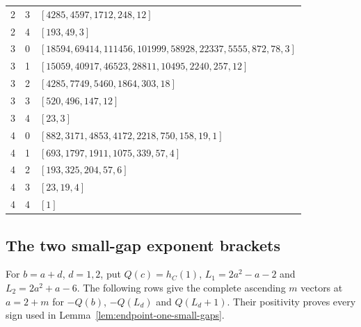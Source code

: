 \begin{tabular}{ccp{13.6cm}}
2 & 3 & $[4285,\allowbreak 4597,\allowbreak 1712,\allowbreak 248,\allowbreak 12]$\\
2 & 4 & $[193,\allowbreak 49,\allowbreak 3]$\\
3 & 0 & $[18594,\allowbreak 69414,\allowbreak 111456,\allowbreak 101999,\allowbreak 58928,\allowbreak 22337,\allowbreak 5555,\allowbreak 872,\allowbreak 78,\allowbreak 3]$\\
3 & 1 & $[15059,\allowbreak 40917,\allowbreak 46523,\allowbreak 28811,\allowbreak 10495,\allowbreak 2240,\allowbreak 257,\allowbreak 12]$\\
3 & 2 & $[4285,\allowbreak 7749,\allowbreak 5460,\allowbreak 1864,\allowbreak 303,\allowbreak 18]$\\
3 & 3 & $[520,\allowbreak 496,\allowbreak 147,\allowbreak 12]$\\
3 & 4 & $[23,\allowbreak 3]$\\
4 & 0 & $[882,\allowbreak 3171,\allowbreak 4853,\allowbreak 4172,\allowbreak 2218,\allowbreak 750,\allowbreak 158,\allowbreak 19,\allowbreak 1]$\\
4 & 1 & $[693,\allowbreak 1797,\allowbreak 1911,\allowbreak 1075,\allowbreak 339,\allowbreak 57,\allowbreak 4]$\\
4 & 2 & $[193,\allowbreak 325,\allowbreak 204,\allowbreak 57,\allowbreak 6]$\\
4 & 3 & $[23,\allowbreak 19,\allowbreak 4]$\\
4 & 4 & $[1]$\\
\bottomrule
\end{tabular}
\endgroup

\subsection{The two small-gap exponent brackets}

For $b=a+d$, $d=1,2$, put $Q(c)=h_C(1)$,
$L_1=2a^2-a-2$ and $L_2=2a^2+a-6$. The following rows give the
complete ascending $m$ vectors at $a=2+m$ for $-Q(b)$, $-Q(L_d)$
and $Q(L_d+1)$. Their positivity proves every sign used in
Lemma~\ref{lem:endpoint-one-small-gaps}.

